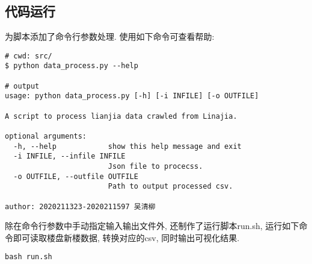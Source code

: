 \subsection{代码运行}
为脚本添加了命令行参数处理. 使用如下命令可查看帮助:
\begin{lstlisting}[language=shell]
# cwd: src/
$ python data_process.py --help

# output
usage: python data_process.py [-h] [-i INFILE] [-o OUTFILE]

A script to process lianjia data crawled from Linajia.

optional arguments:
  -h, --help            show this help message and exit
  -i INFILE, --infile INFILE
                        Json file to procecss.
  -o OUTFILE, --outfile OUTFILE
                        Path to output processed csv.

author: 2020211323-2020211597 吴清柳
\end{lstlisting}

除在命令行参数中手动指定输入输出文件外, 还制作了运行脚本run.sh,
运行如下命令即可读取楼盘新楼数据, 转换对应的csv, 同时输出可视化结果.
\begin{lstlisting}[language=shell]
bash run.sh
\end{lstlisting}
